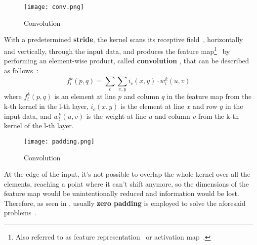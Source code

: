 \documentclass[class=report, crop=false, a4paper, 12pt]{standalone}
\begin{document}
\begin{figure}[!h]
    \centering
    \texttt{[image: conv.png]} %
    \caption{Convolution}
    \label{fig:conv}
\end{figure}

\par With a predetermined \textbf{stride}, the kernel scans its receptive field~\autocite{khanSurveyRecentArchitectures2020}, horizontally and vertically, through the input data, and produces the feature map\footnote{Also referred to as feature representation~\autocite{liSurveyConvolutionalNeural2022} or activation map~\autocite{ajitReviewConvolutionalNeural2020}.}~\autocite{lecunDeepLearning2015, alzubaidiReviewDeepLearning2021} by performing an element-wise product, called \textbf{convolution} , that can be described as follows~\autocite{khanSurveyRecentArchitectures2020}:
$$
f_l^k(p, q) = \sum_{c}^{}\sum_{x, y}^{}i_c(x, y)\cdot w^k_l(u,v)
$$
where $f_l^k(p, q)$ is an element at line $p$ and column $q$ in the feature map from the k-th kernel in the l-th layer, $i_c(x, y)$ is the element at line $x$ and row $y$ in the input data, and $w^k_l(u,v)$ is the weight at line $u$ and column $v$ from the k-th kernel of the l-th layer. 


\begin{figure}[!h]
    \centering
    \texttt{[image: padding.png]} %
    \caption{Convolution}
    \label{fig:padding}
\end{figure}

\par At the edge of the input, it's not possible to overlap the whole kernel over all the elements, reaching a point where it can't shift anymore, so the dimensions of the feature map would be unintentionally reduced and information would be lost. Therefore, as seen in , usually \textbf{zero padding} is employed to solve the aforesaid problems~\autocite{yamashitaConvolutionalNeuralNetworks2018}.
\end{document}
